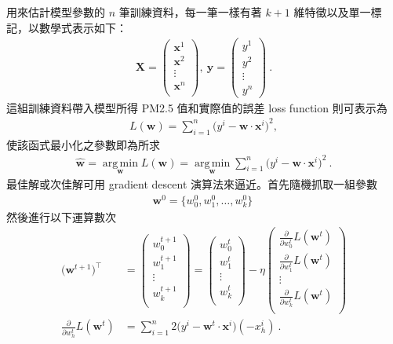 \documentclass[12pt]{article}
\begin{document}
用來估計模型參數的 $n$ 筆訓練資料，每一筆一樣有著 $k + 1$ 維特徵以及單一標記，以數學式表示如下：
\begin{align*}
\mathbf{X} =
    \begin{pmatrix}
    \mathbf{x}^1    \\
    \mathbf{x}^2    \\
    \vdots          \\
    \mathbf{x}^n    \\
    \end{pmatrix},\
\mathbf{y} =
    \begin{pmatrix}
    y^1     \\
    y^2     \\
    \vdots  \\
    y^n
    \end{pmatrix}\ .
\end{align*}
這組訓練資料帶入模型所得 PM2.5 值和實際值的誤差 loss function 則可表示為
\begin{align*}
L(\mathbf{w}) = \sum_{i=1}^n \bigl( y^i - \mathbf{w}\cdot\mathbf{x}^i \bigr)^2 ,
\end{align*}
使該函式最小化之參數即為所求
\begin{align*}
\hat{\mathbf{w}} = \operatorname*{arg\,min}_{\mathbf{w}} L(\mathbf{w})
                        = \operatorname*{arg\,min}_{\mathbf{w}} \sum_{i=1}^n \bigl( y^i - \mathbf{w}\cdot\mathbf{x}^i \bigr)^2
\ .
\end{align*}
最佳解或次佳解可用 gradient descent 演算法來逼近。首先隨機抓取一組參數
\begin{align*}
\mathbf{w}^0 = \{w_0^0, w_1^0, \ldots, w_k^0 \} \ 
\end{align*}
然後進行以下運算數次
\begin{align*}
\bigl(\mathbf{w}^{t+1}\bigr)^\intercal
&=
\begin{pmatrix}
    w_0^{t+1}   \\
    w_1^{t+1}   \\
    \vdots      \\
    w_k^{t+1}   \\
\end{pmatrix}
=
\begin{pmatrix}
    w_0^{t}     \\
    w_1^{t}     \\
    \vdots      \\
    w_k^{t}     \\
\end{pmatrix}
- \eta
\begin{pmatrix}
    \frac{\partial}{\partial w_0^t} L(\mathbf{w}^t) \\
    \frac{\partial}{\partial w_1^t} L(\mathbf{w}^t) \\
    \vdots                                          \\
    \frac{\partial}{\partial w_k^t} L(\mathbf{w}^t) \\
\end{pmatrix} \\
\frac{\partial}{\partial w^t_h} L(\mathbf{w}^t) &= \sum_{i=1}^{n} 2 \bigl( y^i - \mathbf{w}^t \cdot \mathbf{x}^i \bigr) (-x^i_h) \ .
\end{align*}
\end{document}
